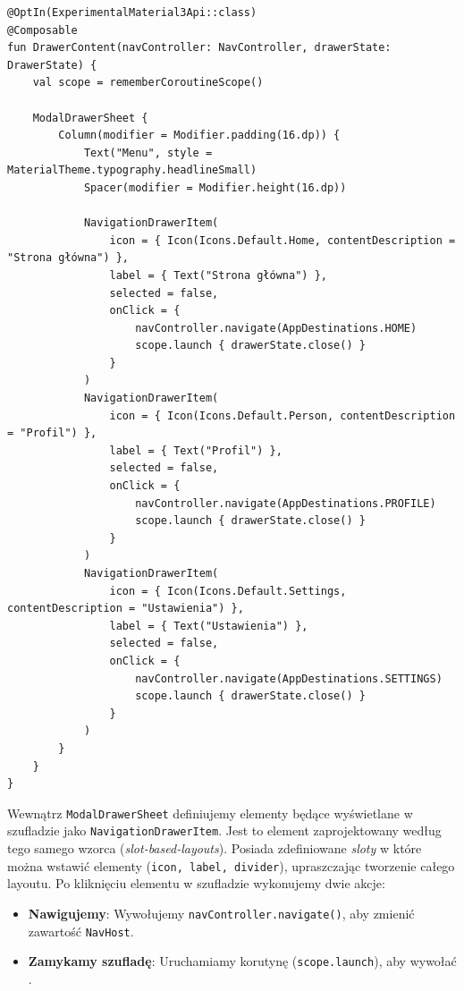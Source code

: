 \begin{verbatim}
@OptIn(ExperimentalMaterial3Api::class)
@Composable
fun DrawerContent(navController: NavController, drawerState: DrawerState) {
    val scope = rememberCoroutineScope()

    ModalDrawerSheet {
        Column(modifier = Modifier.padding(16.dp)) {
            Text("Menu", style = MaterialTheme.typography.headlineSmall)
            Spacer(modifier = Modifier.height(16.dp))

            NavigationDrawerItem(
                icon = { Icon(Icons.Default.Home, contentDescription = "Strona główna") },
                label = { Text("Strona główna") },
                selected = false,
                onClick = {
                    navController.navigate(AppDestinations.HOME)
                    scope.launch { drawerState.close() }
                }
            )
            NavigationDrawerItem(
                icon = { Icon(Icons.Default.Person, contentDescription = "Profil") },
                label = { Text("Profil") },
                selected = false,
                onClick = {
                    navController.navigate(AppDestinations.PROFILE)
                    scope.launch { drawerState.close() }
                }
            )
            NavigationDrawerItem(
                icon = { Icon(Icons.Default.Settings, contentDescription = "Ustawienia") },
                label = { Text("Ustawienia") },
                selected = false,
                onClick = {
                    navController.navigate(AppDestinations.SETTINGS)
                    scope.launch { drawerState.close() }
                }
            )
        }
    }
}
\end{verbatim}

Wewnątrz \texttt{ModalDrawerSheet} definiujemy elementy będące wyświetlane w szufladzie jako \texttt{NavigationDrawerItem}. Jest to element zaprojektowany według tego samego wzorca (\textit{slot-based-layouts}). Posiada zdefiniowane \textit{sloty} w które można wstawić elementy (\texttt{icon, label, divider}), upraszczając tworzenie całego layoutu.
Po kliknięciu elementu w szufladzie wykonujemy dwie akcje:
\begin{itemize}
  \item \textbf{Nawigujemy}: Wywołujemy \texttt{navController.navigate()}, aby zmienić zawartość \texttt{NavHost}.
  \item \textbf{Zamykamy szufladę}: Uruchamiamy korutynę (\texttt{scope.launch}), aby wywołać .
\end{itemize}

